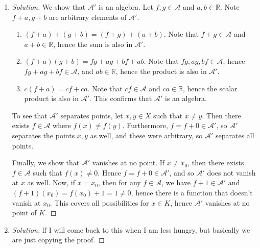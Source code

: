 \documentclass{article}
\newcommand{\R}{{\mathbb R}}
\theoremstyle{remark}
\begin{document}
\begin{enumerate}
	\item \begin{proof}[Solution]
		We show that $\mathcal{A}'$ is an algebra. Let $f,g \in \mathcal{A}$ and $a,b \in \R$.
		Note $f + a, g + b$ are arbitrary elements of $\mathcal{A}'$.
		\begin{enumerate}
			\item $(f + a) + (g + b) = (f + g) + (a + b)$.
				Note that $f + g \in \mathcal{A}$ and $a + b \in \R$,
				hence the sum is also in $\mathcal{A}'$.
			\item $(f+a)(g+b) = fg + ag + bf + ab$.
				Note that $fg, ag, bf \in \mathcal{A}$, hence $fg + ag + bf \in \mathcal{A}$,
				and $ab \in \R$, hence the product is also in $\mathcal{A}'$.
			\item $c(f+a) = cf + ca$.
				Note that $cf \in \mathcal{A}$ and $ca \in \R$,
				hence the scalar product is also in $\mathcal{A}'$.
				This confirms that $\mathcal{A}'$ is an algebra.
		\end{enumerate}

		To see that $\mathcal{A}'$ separates points, let $x,y \in X$
		such that $x \neq y$.
		Then there exists $f \in \mathcal{A}$ where $f(x) \neq f(y)$.
		Furthermore, $f = f + 0 \in \mathcal{A}'$,
		so $\mathcal{A}'$ separates the points $x,y$ as well,
		and these were arbitrary, so $\mathcal{A}'$ separates all points.

		Finally, we show that $\mathcal{A}'$ vanishes at no point.
		If $x \neq x_0$, then there exists $f \in \mathcal{A}$ such that $f(x) \neq 0$.
		Hence $f = f + 0 \in \mathcal{A}'$, and so $\mathcal{A}'$ does not
		vanish at $x$ as well.
		Now, if $x = x_0$, then for any $f \in \mathcal{A}$,
		we have $f + 1 \in \mathcal{A}'$ and $(f+1)(x_0) = f(x_0) + 1 = 1 \neq 0$,
		hence there is a function that doesn't vanish at $x_0$.
		This covers all possibilities for $x \in K$,
		hence $\mathcal{A}'$ vanishes at no point of $K$.
	\end{proof}
	\item \begin{proof}[Solution]
		ff I will come back to this when I am less hungry,
		but basically we are just copying the proof.
	\end{proof}
\end{enumerate}
\end{document}
